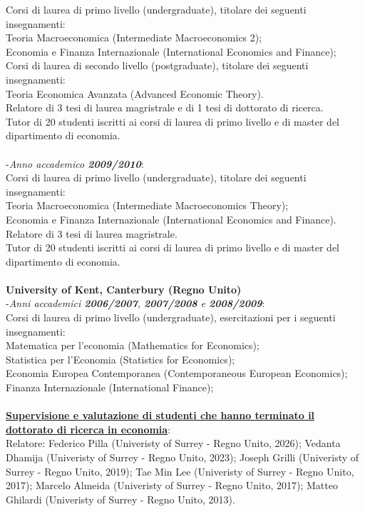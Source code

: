 \documentclass[10p]{article}
\begin{document}
Corsi di laurea di primo livello (undergraduate), titolare dei seguenti insegnamenti: \\
Teoria Macroeconomica (Intermediate Macroeconomics 2); \\
Economia e Finanza Internazionale (International Economics and Finance);\\
Corsi di laurea di secondo livello (postgraduate), titolare dei seguenti insegnamenti: \\
Teoria Economica Avanzata (Advanced Economic Theory).\\
Relatore di 3 tesi di laurea magristrale e di 1 tesi di dottorato di ricerca.\\
Tutor di 20 studenti iscritti ai corsi di laurea di primo livello e di master del dipartimento di economia.\\
\\
-\emph{Anno accademico \textbf{2009/2010}}: \\
Corsi di laurea di primo livello (undergraduate), titolare dei seguenti insegnamenti: \\
Teoria Macroeconomica (Intermediate Macroeconomics Theory); \\
Economia e Finanza Internazionale (International Economics and Finance).\\
Relatore di 3 tesi di laurea magristrale.\\
Tutor di 20 studenti iscritti ai corsi di laurea di primo livello e di master del dipartimento di economia.\\
\\
{\bf University of Kent, Canterbury (Regno Unito)}\\
-\emph{Anni accademici \textbf{2006/2007}, \textbf{2007/2008} e \textbf{2008/2009}}: \\
Corsi di laurea di primo livello (undergraduate), esercitazioni per i seguenti insegnamenti: \\
Matematica per l'economia (Mathematics for Economics);\\
Statistica per l'Economia (Statistics for Economics);\\
Economia Europea Contemporanea (Contemporaneous European Economics);
Finanza Internazionale (International Finance);
\\
\\
{\bf \underline{Supervisione e valutazione di studenti che hanno terminato il dottorato di ricerca in economia}}: \\
Relatore: Federico Pilla (Univeristy of Surrey - Regno Unito, 2026); Vedanta Dhamija (Univeristy of Surrey - Regno Unito, 2023); Joseph Grilli (Univeristy of Surrey - Regno Unito, 2019);  Tae Min Lee (Univeristy of Surrey - Regno Unito, 2017); Marcelo Almeida (Univeristy of Surrey - Regno Unito, 2017); Matteo Ghilardi (Univeristy of Surrey - Regno Unito, 2013).\\
\end{document}
